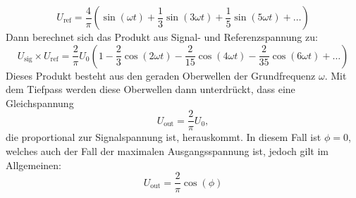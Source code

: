     \begin{equation*}
        U_{\text{ref}} = \frac{4}{\pi} \left( \sin(\omega t) + \frac{1}{3} \sin(3 \omega t ) +  \frac{1}{5} \sin(5 \omega t) + \dots \right) 
    \end{equation*}
    Dann berechnet sich das Produkt aus Signal- und Referenzspannung zu:
    \begin{equation*}
        U_{\text{sig}} \times U_{\text{ref}} = \frac{2}{\pi} U_0 \left(1 - \frac{2}{3} \cos(2 \omega t) - \frac{2}{15} \cos(4 \omega t) - \frac{2}{35} \cos(6 \omega t) + \dots \right) 
    \end{equation*}
    Dieses Produkt besteht aus den geraden Oberwellen der Grundfrequenz $\omega$. Mit dem Tiefpass werden diese Oberwellen dann unterdrückt, dass eine Gleichspannung
    \begin{equation}
        \label{eqn:U_out}
        U_{\text{out}} = \frac{2}{\pi} U_0, 
    \end{equation}
    die proportional zur Signalspannung ist, herauskommt. In diesem Fall ist $\phi = 0$, welches auch der Fall der maximalen Ausgangsspannung ist, jedoch gilt im Allgemeinen:
    \begin{equation}
        \label{eqn:Kosinus}
        U_{\text{out}} = \frac{2}{\pi} \cos(\phi)
    \end{equation}